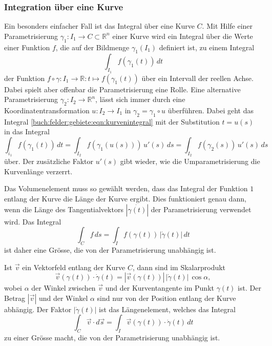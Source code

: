%
%
\subsubsection{Integration über eine Kurve}
Ein besonders einfacher Fall ist das Integral über eine Kurve $C$.
Mit Hilfe einer Parametrisierung $\gamma_1\colon I_1\to C\subset \mathbb{R}^n$
einer Kurve wird ein Integral über die Werte einer Funktion $f$, die auf
der Bildmenge $\gamma_1(I_1)$ definiert ist, zu einem Integral
\begin{equation}
\int_{I_1}
f(\gamma_1(t))
\,dt
\label{buch:felder:gebiete:eqn:kurvenintegral}
\end{equation}
der Funktion $f\circ\gamma\colon I_1\to\mathbb{R}:t\mapsto f(\gamma_1(t))$
über ein Intervall der reellen Achse.
Dabei spielt aber offenbar die Parametrisierung eine Rolle.
Eine alternative Parametrisierung $\gamma_2\colon I_2\to\mathbb{R}^n$,
lässt sich immer durch eine Koordinatentransformation $u\colon I_2\to I_1$
in $\gamma_2 = \gamma_1\circ u$ überführen.
Dabei geht das Integral
\eqref{buch:felder:gebiete:eqn:kurvenintegral}
mit der Substitution $t=u(s)$
in das Integral
\[
\int_{i_1}
f(\gamma_1(t))
\,dt
=
\int_{I_2}
f(\gamma_1(u(s)))
\,
u'(s)
\,ds
=
\int_{I_2}
f(\gamma_2(s))
\,
u'(s)
\,ds
\]
über.
Der zusätzliche Faktor $u'(s)$ gibt wieder, wie die Umparametrisierung
die Kurvenlänge verzerrt.

Das Volumenelement muss so gewählt werden, dass das Integral der Funktion
$1$ entlang der Kurve die Länge der Kurve ergibt.
Dies funktioniert genau dann, wenn die Länge des Tangentialvektors
$|\dot{\gamma(t)}|$ der Parametrisierung verwendet wird.
Das Integral
\[
\int_C f\,ds
=
\int_I f(\gamma(t))\,|\dot{\gamma}(t)|\,dt
\]
ist daher eine Grösse, die von der Parametrisierung unabhängig ist.

Ist $\vec{v}$ ein Vektorfeld entlang der Kurve $C$, dann sind im Skalarprodukt
\[
\vec{v}(\gamma(t))\cdot \dot{\gamma}(t)
=
|\vec{v}(\gamma(t))| \, |\dot{\gamma}(t)|\, \cos \alpha,
\]
wobei $\alpha$ der Winkel zwischen $\vec{v}$ und der Kurventangente
im Punkt $\gamma(t)$ ist.
Der Betrag $|\vec{v}|$ und der Winkel $\alpha$ sind
nur von der Position entlang der Kurve abhängig.
Der Faktor $|\dot{\gamma}(t)|$ ist das Längenelement, welches das Integral
\[
\int_C \vec{v}\cdot d\vec{s}
=
\int_I \vec{v}(\gamma(t))\cdot \dot{\gamma}(t)\,dt
\]
zu einer Grösse macht, die von der Parametrisierung unabhängig ist.

%
%
